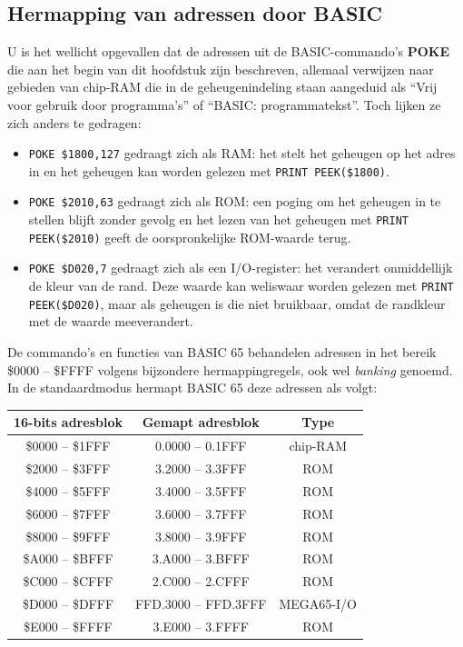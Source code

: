 \subsection{Hermapping van adressen door BASIC}

U is het wellicht opgevallen dat de adressen uit de BASIC-commando's {\bf POKE} die aan het begin van dit hoofdstuk zijn beschreven, allemaal verwijzen naar gebieden van chip-RAM die in de geheugenindeling staan aangeduid als ``Vrij voor gebruik door programma's'' of ``BASIC: programmatekst''. Toch lijken ze zich anders te gedragen:

\begin{itemize}
\item \texttt{POKE \$1800,127} gedraagt zich als RAM: het stelt het geheugen op het adres in en het geheugen kan worden gelezen met \texttt{PRINT PEEK(\$1800)}.\item \texttt{POKE \$2010,63} gedraagt zich als ROM: een poging om het geheugen in te stellen blijft zonder gevolg en het lezen van het geheugen met \texttt{PRINT PEEK(\$2010)} geeft de oorspronkelijke ROM-waarde terug.\item \texttt{POKE \$D020,7} gedraagt zich als een I/O-register: het verandert onmiddellijk de kleur van de rand. Deze waarde kan weliswaar worden gelezen met \texttt{PRINT PEEK(\$D020)}, maar als geheugen is die niet bruikbaar, omdat de randkleur met de waarde meeverandert.
\end{itemize}

\newpage

De commando's en functies van BASIC 65 behandelen adressen in het bereik \$0000 -- \$FFFF volgens bijzondere hermappingregels, ook wel {\em banking} genoemd. In de standaardmodus hermapt BASIC 65 deze adressen als volgt:

\begin{center}
\begin{tabular}{|c|c|c|}
\hline
{\bf 16-bits adresblok} & {\bf Gemapt adresblok} & {\bf Type} \\
\hline
\$0000 -- \$1FFF & 0.0000 -- 0.1FFF & chip-RAM \\
\hline
\$2000 -- \$3FFF & 3.2000 -- 3.3FFF & ROM \\
\hline
\$4000 -- \$5FFF & 3.4000 -- 3.5FFF & ROM \\
\hline
\$6000 -- \$7FFF & 3.6000 -- 3.7FFF & ROM \\
\hline
\$8000 -- \$9FFF & 3.8000 -- 3.9FFF & ROM \\
\hline
\$A000 -- \$BFFF & 3.A000 -- 3.BFFF & ROM \\
\hline
\$C000 -- \$CFFF & 2.C000 -- 2.CFFF & ROM \\
\hline
\$D000 -- \$DFFF & FFD.3000 -- FFD.3FFF & MEGA65-I/O\\
\hline
\$E000 -- \$FFFF & 3.E000 -- 3.FFFF & ROM \\
\hline
\end{tabular}
\end{center}


